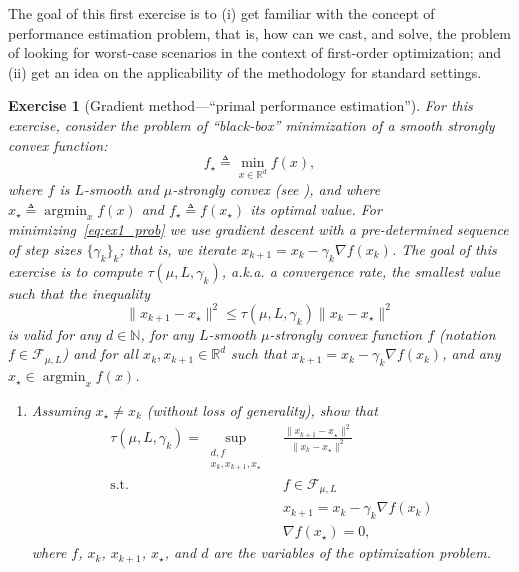 \documentclass[11pt,a4paper]{article}
\DeclareMathOperator*{\argmin}{argmin}
\newtheorem{exercise}{Exercise}
\begin{document}
	The goal of this first exercise is to (i) get familiar with the concept of performance estimation problem, that is, how can we cast, and solve, the problem of looking for worst-case scenarios in the context of first-order optimization; and (ii) get an idea on the applicability of the methodology for standard settings.
	
	\begin{exercise}[Gradient method---``primal performance estimation'']\label{ex1} For this exercise, consider the problem of ``black-box'' minimization of a smooth strongly convex function:
	\begin{equation}\label{eq:ex1_prob}
	f_\star \triangleq \min_{x\in\mathbb{R}^d} f(x),
	\end{equation}
	where $f$ is $L$-smooth and $\mu$-strongly convex (see ), and where $x_\star\triangleq \argmin_{x} f(x)$ and $f_\star\triangleq f(x_\star)$ its optimal value. For minimizing~\eqref{eq:ex1_prob} we use gradient descent with a pre-determined sequence of step sizes $\{\gamma_k\}_k$; that is, we iterate $x_{k+1}=x_k-\gamma_k \nabla f(x_k)$.
	The goal of this exercise is to compute $\tau(\mu,L,\gamma_k)$, a.k.a.\! a convergence rate, the smallest value such that the inequality
	\begin{equation}\label{ex1:eq:distance}
	 \|x_{k+1}-x_\star\|^2 \leqslant \tau(\mu,L,\gamma_k) \|x_k-x_\star\|^2
	\end{equation}
	is valid for any $d\in\mathbb{N}$, for any $L$-smooth $\mu$-strongly convex function $f$ (notation $f\in\mathcal{F}_{\mu,L}$) and for all $x_k,x_{k+1}\in\mathbb{R}^d$ such that $x_{k+1}=x_k-\gamma_k \nabla f(x_k)$, and any $x_\star\in\argmin_x f(x)$. 
	\begin{enumerate}
	\item Assuming $x_\star\neq x_k$ (without loss of generality), show that 
	\begin{equation}\label{ex1:eq:base_pep1}
	\begin{aligned}
		\tau(\mu,L,\gamma_k)= \sup_{\substack{d,f\\x_k,x_{k+1},x_\star}} \ &\frac{\|x_{k+1}-x_\star\|^2}{\|x_k-x_\star\|^2}\\
		\text{s.t. } & f\in\mathcal{F}_{\mu,L} \\
		&x_{k+1}=x_k-\gamma_k  \nabla f(x_k)\\
		&\nabla f(x_\star)=0,
		\end{aligned}
	\end{equation} where $f$, $x_k$, $x_{k+1}$, $x_\star$, and $d$ are the variables of the optimization problem.
		

\end{enumerate}
\end{exercise}
\end{document}

